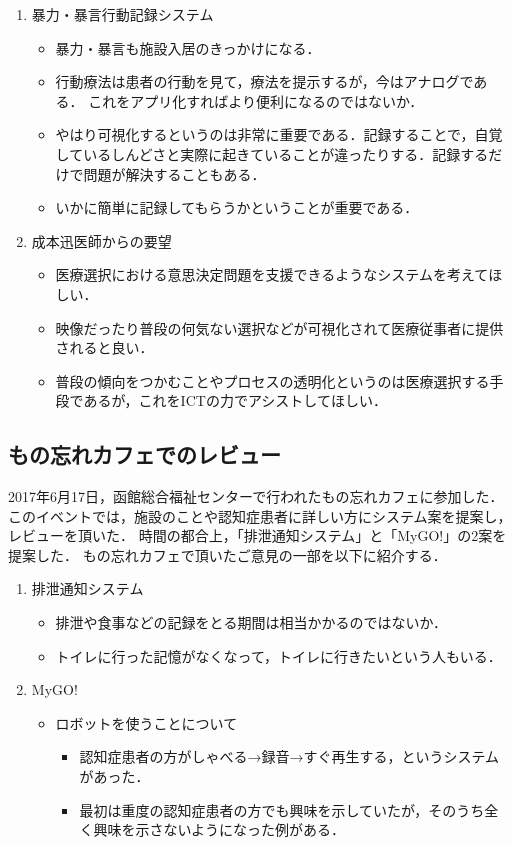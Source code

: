 \documentclass[../report]{subfiles}
\begin{document}
\begin{enumerate}
    \item[] 暴力・暴言行動記録システム
\begin{itemize}
    \item 暴力・暴言も施設入居のきっかけになる．
    \item 行動療法は患者の行動を見て，療法を提示するが，今はアナログである．
これをアプリ化すればより便利になるのではないか．
    \item やはり可視化するというのは非常に重要である．記録することで，自覚しているしんどさと実際に起きていることが違ったりする．記録するだけで問題が解決することもある．
    \item いかに簡単に記録してもらうかということが重要である．
\end{itemize}

    \item[] 成本迅医師からの要望
\begin{itemize}
    \item 医療選択における意思決定問題を支援できるようなシステムを考えてほしい．
    \item 映像だったり普段の何気ない選択などが可視化されて医療従事者に提供されると良い．
    \item 普段の傾向をつかむことやプロセスの透明化というのは医療選択する手段であるが，これをICTの力でアシストしてほしい．
\end{itemize}
\end{enumerate}

\subsection{もの忘れカフェでのレビュー} \label{sec:4_hyouka_monowasurecafe}
2017年6月17日，函館総合福祉センターで行われたもの忘れカフェに参加した．
このイベントでは，施設のことや認知症患者に詳しい方にシステム案を提案し，レビューを頂いた．
時間の都合上，「排泄通知システム」と「MyGO!」の2案を提案した．
もの忘れカフェで頂いたご意見の一部を以下に紹介する．

\begin{enumerate}
    \item[] 排泄通知システム
\begin{itemize}
    \item 排泄や食事などの記録をとる期間は相当かかるのではないか．
    \item トイレに行った記憶がなくなって，トイレに行きたいという人もいる．
\end{itemize}

    \item[] MyGO!
\begin{itemize}
    \item ロボットを使うことについて
	\begin{itemize}
		\item 認知症患者の方がしゃべる→録音→すぐ再生する，というシステムがあった．
		\item 最初は重度の認知症患者の方でも興味を示していたが，そのうち全く興味を示さないようになった例がある．
	\end{itemize}
\end{itemize}
\end{enumerate}
\end{document}
